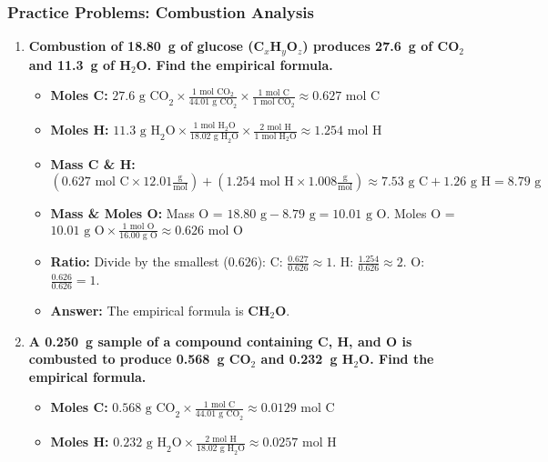 \documentclass{article}
\begin{document}
\subsubsection*{Practice Problems: Combustion Analysis}
\begin{enumerate}[itemsep=5pt]
    \item \textbf{Combustion of \SI{18.80}{g} of glucose (C\(_x\)H\(_y\)O\(_z\)) produces \SI{27.6}{g} of CO\(_2\) and \SI{11.3}{g} of H\(_2\)O. Find the empirical formula.}
    \begin{itemize}
        \item \textbf{Moles C:} \( 27.6 \text{ g CO}_2 \times \frac{1 \text{ mol CO}_2}{44.01 \text{ g CO}_2} \times \frac{1 \text{ mol C}}{1 \text{ mol CO}_2} \approx 0.627 \text{ mol C} \)
        \item \textbf{Moles H:} \( 11.3 \text{ g H}_2\text{O} \times \frac{1 \text{ mol H}_2\text{O}}{18.02 \text{ g H}_2\text{O}} \times \frac{2 \text{ mol H}}{1 \text{ mol H}_2\text{O}} \approx 1.254 \text{ mol H} \)
        \item \textbf{Mass C & H:} \( (0.627 \text{ mol C} \times 12.01 \frac{\text{g}}{\text{mol}}) + (1.254 \text{ mol H} \times 1.008 \frac{\text{g}}{\text{mol}}) \approx 7.53 \text{ g C} + 1.26 \text{ g H} = 8.79 \text{ g} \)
        \item \textbf{Mass & Moles O:} Mass O = \(18.80 \text{ g} - 8.79 \text{ g} = 10.01 \text{ g O}\). Moles O = \( 10.01 \text{ g O} \times \frac{1 \text{ mol O}}{16.00 \text{ g O}} \approx 0.626 \text{ mol O} \)
        \item \textbf{Ratio:} Divide by the smallest (0.626): C: \( \frac{0.627}{0.626} \approx 1 \). H: \( \frac{1.254}{0.626} \approx 2 \). O: \( \frac{0.626}{0.626} = 1 \).
        \item \textbf{Answer:} The empirical formula is \textbf{CH\(_2\)O}.
    \end{itemize}
    \item \textbf{A \SI{0.250}{g} sample of a compound containing C, H, and O is combusted to produce \SI{0.568}{g} CO\(_2\) and \SI{0.232}{g} H\(_2\)O. Find the empirical formula.}
    \begin{itemize}
        \item \textbf{Moles C:} \( 0.568 \text{ g CO}_2 \times \frac{1 \text{ mol C}}{44.01 \text{ g CO}_2} \approx 0.0129 \text{ mol C} \)
        \item \textbf{Moles H:} \( 0.232 \text{ g H}_2\text{O} \times \frac{2 \text{ mol H}}{18.02 \text{ g H}_2\text{O}} \approx 0.0257 \text{ mol H} \)

\end{itemize}
\end{enumerate}
\end{document}
